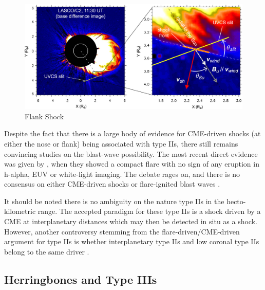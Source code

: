 \begin{figure}
\begin{center}
\includegraphics[trim=1cm 0cm 0cm 0cm, scale=1]{images/mancuso.png}
\caption{Flank Shock}
\end{center}
\label{fig:mancuso_uv}
\end{figure}
Despite the fact that there is a large body of evidence for CME-driven shocks (at either the nose or flank) being associated with type IIs, there still remains convincing studies on the blast-wave possibility. The most recent direct evidence was given by \citep{mag2012}, when they showed a compact flare with no sign of any eruption in h-alpha, EUV or white-light imaging. The debate rages on, and there is no consensus on either CME-driven shocks or flare-ignited blast waves \citep{vrsnak2008}.


It should be noted there is no ambiguity on the nature type IIs in the hecto-kilometric range. The accepted paradigm for these type IIs is a shock driven by a CME at interplanetary distances which may then be detected in situ as a shock. However, another controversy stemming from the flare-driven/CME-driven argument for type IIs is whether interplanetary type IIs and low coronal type IIs belong to the same driver \citep{cane2005}.


\subsection{Herringbones and Type IIIs}

